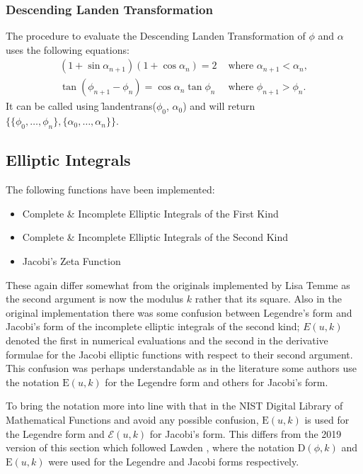 \subsubsection{Descending Landen Transformation}
The procedure to evaluate the Descending Landen Transformation of 
$\phi$ and $\alpha$ uses the following equations:
\begin{align*}
 (1+\sin \alpha_{n+1})(1+\cos \alpha_n)=2 &\text{ where } \alpha_{n+1}<\alpha_n, \\
  \tan(\phi_{n+1}-\phi_n)=\cos \alpha_n \tan \phi_n & \text{ where } \phi_{n+1}>\phi_n.
\end{align*}
It can be called using \f{landentrans}($\phi_0$, $\alpha_0$)
and will return \\
$\{\{\phi_0, \ldots ,\phi_n\},\{\alpha_0, \ldots ,\alpha_n\}\}$.

\subsection{Elliptic Integrals}
\hypertarget{ELLIPI}{}
The following functions have been implemented:

\begin{itemize}
\item Complete \& Incomplete Elliptic Integrals of the First Kind
\item Complete \& Incomplete Elliptic Integrals of the Second Kind
\item Jacobi's Zeta Function
\end{itemize}

These again differ somewhat from the originals implemented by Lisa Temme
as the second argument is now the modulus $k$ rather that its square.
Also in the original implementation  there was some confusion between
Legendre's form and Jacobi's form of the incomplete elliptic integrals of
the second kind; $E(u,k)$ denoted the first in numerical
evaluations and the second in the derivative formulae for the Jacobi
elliptic functions with respect to their second argument.
This confusion was perhaps understandable
as in the literature some authors use the notation $\mathrm{E}(u, k)$ for
the Legendre form and others for Jacobi's form.

To bring the notation more into line with that in the NIST Digital Library of
Mathematical Functions and avoid any possible confusion, $\mathrm{E}(u, k)$ is used for
the Legendre form and $\mathcal{E}(u, k)$ for Jacobi's form.
This differs from the 2019 version of this section which followed Lawden \cite{Lawden:89}, 
where the notation $\mathrm{D}(\phi, k)$  and $\mathrm{E}(u, k)$ were used for the 
Legendre and Jacobi forms respectively.


